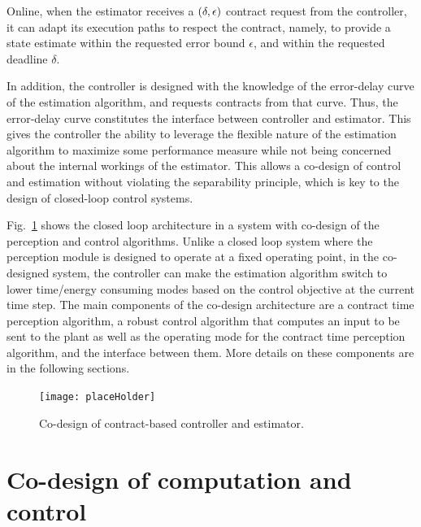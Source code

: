 Online, when the estimator receives a $(\delta,\epsilon)$ contract request from the controller, it can adapt its execution paths to respect the contract, namely, to provide a state estimate within the requested error bound $\epsilon$, and within the requested deadline $\delta$.

In addition, the controller is designed with the knowledge of the error-delay curve of the estimation algorithm, and requests contracts from that curve.
Thus, the error-delay curve constitutes the interface between controller and estimator.
This gives the controller the ability to leverage the flexible nature of the estimation algorithm to maximize some performance measure while not being concerned about the internal workings of the estimator. 
This allows a co-design of control and estimation without violating the separability principle, which is key to the design of closed-loop control systems.

Fig.~\ref{fig:fullcodesignedCE} shows the closed loop architecture in a system with co-design of the perception and control algorithms. 
Unlike a closed loop system where the perception module is designed to operate at a fixed operating point, in the co-designed system, the controller can make the estimation algorithm switch to lower time/energy consuming modes based on the control objective at the current time step.
The main components of the co-design architecture are a contract time perception algorithm, a robust control algorithm that computes an input to be sent to the plant as well as the operating mode for the contract time perception algorithm, and the interface between them. More details on these components are in the following sections.

\begin{figure}[t]
	\centering
		\texttt{[image: placeHolder]}
		\label{fig:fullcodesignedCE}
		\caption{Co-design of contract-based controller and estimator.}			
\end{figure}



\section{Co-design of computation and control}

